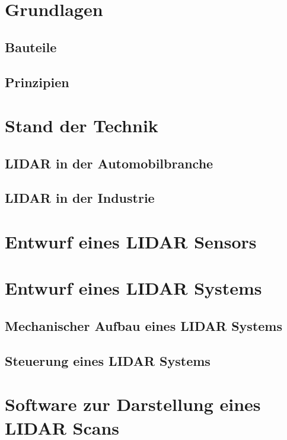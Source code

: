 
\chapter{Grundlagen}
\section{Bauteile}
\section{Prinzipien}

\chapter{Stand der Technik}
\section{LIDAR in der Automobilbranche}
\section{LIDAR in der Industrie}

\chapter{Entwurf eines LIDAR Sensors}

\chapter{Entwurf eines LIDAR Systems}
\section{Mechanischer Aufbau eines LIDAR Systems}
\section{Steuerung eines LIDAR Systems}

\chapter{Software zur Darstellung eines LIDAR Scans}

